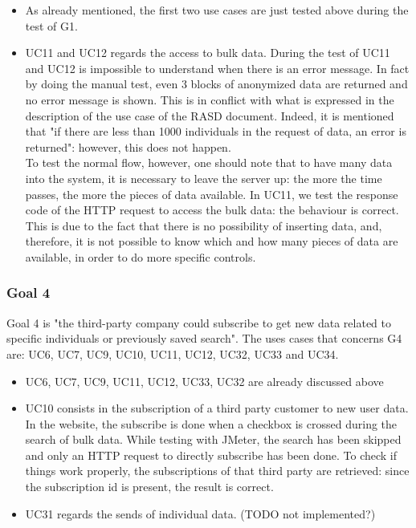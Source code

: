 \begin{itemize}
\item 
As already mentioned, the first two use cases are just tested above during the test of G1.

\item 
UC11 and UC12 regards the access to bulk data.
During the test of UC11 and UC12 is impossible to understand when there is an error message. 
In fact by doing the manual test, even 3 blocks of anonymized data are returned and no error message is shown. 
This is in conflict with what is expressed in the description of the use case of the RASD document. 
Indeed, it is mentioned that "if there are less than 1000 individuals in the request of data, an error is returned":
however, this does not happen. \\
To test the normal flow, however, one should note that to have many data into the system, it is necessary to leave the server up: the more the time passes, the more the pieces of data available. In UC11, we test the response code of the HTTP request to access the bulk data: the
behaviour is correct. This is due to the fact that there is no possibility of inserting data, and, therefore, it is not possible to know which and how many pieces of data are available, in order to do more specific controls. 

\end{itemize}

\subsubsection{Goal 4}
Goal 4 is "the third-party company could subscribe to get new data related to specific
individuals or previously saved search".
The uses cases that concerns G4 are: UC6, UC7, UC9, UC10, UC11, UC12, UC32, UC33 and UC34. \\

\begin{itemize}
\item 
UC6, UC7, UC9, UC11, UC12, UC33, UC32 are already discussed above

\item 
UC10 consists in the subscription of a third party customer to new user data. \\
In the website, the subscribe is done when a checkbox is crossed during the search of bulk data. 
While testing with JMeter, the search has been skipped and only an HTTP request to directly subscribe has been done.
To check if things work properly, the subscriptions of that third party are retrieved: since the subscription id is present, the
result is correct.

\item UC31 regards the sends of individual data. 
(TODO not implemented?)

\end{itemize}

